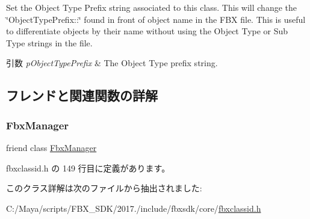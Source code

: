 Set the Object Type Prefix string associated to this class. This will change the \char`\"{}\+Object\+Type\+Prefix\+::\char`\"{} found in front of object name in the F\+BX file. This is useful to differentiate objects by their name without using the Object Type or Sub Type strings in the file. 
\begin{DoxyParams}{引数}
{\em p\+Object\+Type\+Prefix} & The Object Type prefix string. \\
\hline
\end{DoxyParams}


\subsection{フレンドと関連関数の詳解}
\mbox{\label{class_fbx_class_id_aa6292f0d09535e3fe957088d09276268}} 
\subsubsection{\texorpdfstring{Fbx\+Manager}{FbxManager}}
{\footnotesize\ttfamily friend class \hyperlink{class_fbx_manager}{Fbx\+Manager}\hspace{0.3cm}{\ttfamily [friend]}}



 fbxclassid.\+h の 149 行目に定義があります。



このクラス詳解は次のファイルから抽出されました\+:\begin{DoxyCompactItemize}
\item 
C\+:/\+Maya/scripts/\+F\+B\+X\+\_\+\+S\+D\+K/2017./include/fbxsdk/core/\hyperlink{fbxclassid_8h}{fbxclassid.\+h}\end{DoxyCompactItemize}
